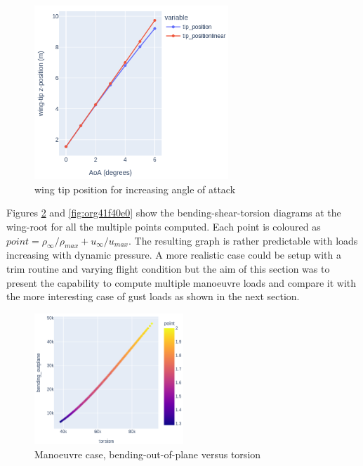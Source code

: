 \documentclass[11pt]{article}
\begin{document}
\begin{figure}[htbp]
\centering
\includegraphics[width=0.65\textwidth]{figs/manoeuvre_wingtip.png}
\caption{\label{fig:org2aa5960}wing tip position for increasing angle of attack}
\end{figure}

Figures \ref{fig:orgd2e3b7b} and \ref{fig:org41f40e0} show the bending-shear-torsion diagrams at the wing-root for all the multiple points computed. Each point is coloured as \(point = \rho_{\infty} / \rho_{max} + u_{\infty} / u_{max}\). The resulting graph is rather predictable with loads increasing with dynamic pressure. A more realistic case could be setup with a trim routine and varying flight condition but the aim of this section was to present the capability to compute multiple manoeuvre loads and compare it with the more interesting case of gust loads as shown in the next section.

\begin{figure}[htbp]
\centering
\includegraphics[width=0.5\textwidth]{figs/manoeuvre_bendingtorsion.png}
\caption{\label{fig:orgd2e3b7b}Manoeuvre case, bending-out-of-plane versus torsion}
\end{figure}
\end{document}

